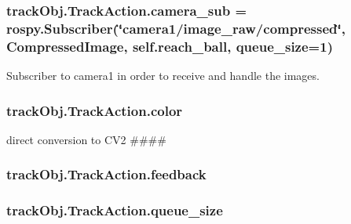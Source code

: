 \subsubsection[{\texorpdfstring{camera\+\_\+sub}{camera_sub}}]{\setlength{\rightskip}{0pt plus 5cm}track\+Obj.\+Track\+Action.\+camera\+\_\+sub = rospy.\+Subscriber(\char`\"{}camera1/image\+\_\+raw/compressed\char`\"{}, Compressed\+Image, self.\+reach\+\_\+ball, {\bf queue\+\_\+size}=1)\hspace{0.3cm}{\ttfamily [static]}}\hypertarget{classtrackObj_1_1TrackAction_acc882f12fe6442f22f15258f0c92785f}{}\label{classtrackObj_1_1TrackAction_acc882f12fe6442f22f15258f0c92785f}


Subscriber to camera1 in order to receive and handle the images. 

\subsubsection[{\texorpdfstring{color}{color}}]{\setlength{\rightskip}{0pt plus 5cm}track\+Obj.\+Track\+Action.\+color}\hypertarget{classtrackObj_1_1TrackAction_a8e45de7039848d1f1e67461b70a82fb1}{}\label{classtrackObj_1_1TrackAction_a8e45de7039848d1f1e67461b70a82fb1}


direct conversion to C\+V2 \#\#\#\# 

\subsubsection[{\texorpdfstring{feedback}{feedback}}]{\setlength{\rightskip}{0pt plus 5cm}track\+Obj.\+Track\+Action.\+feedback\hspace{0.3cm}{\ttfamily [static]}}\hypertarget{classtrackObj_1_1TrackAction_ac2c204266bc7dbf8d974f78e1890f2b8}{}\label{classtrackObj_1_1TrackAction_ac2c204266bc7dbf8d974f78e1890f2b8}
\subsubsection[{\texorpdfstring{queue\+\_\+size}{queue_size}}]{\setlength{\rightskip}{0pt plus 5cm}track\+Obj.\+Track\+Action.\+queue\+\_\+size\hspace{0.3cm}{\ttfamily [static]}}\hypertarget{classtrackObj_1_1TrackAction_a1ca982e6f881cd51690264f502781c04}{}\label{classtrackObj_1_1TrackAction_a1ca982e6f881cd51690264f502781c04}

